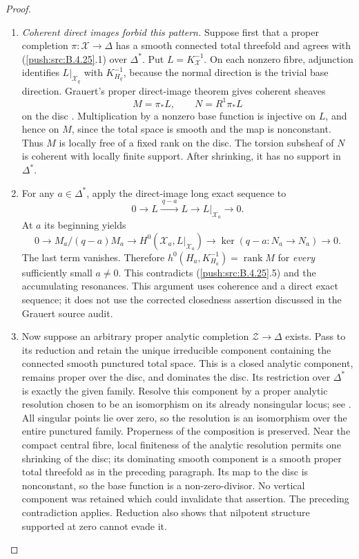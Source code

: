 \begin{proof}
\begin{enumerate}[label=\arabic*.,leftmargin=*]
\item \emph{Coherent direct images forbid this pattern.}
Suppose first that a proper completion
$\pi:\mathcal X\to\Delta$ has a smooth connected
total threefold and agrees with (\ref{push:src:B.4.25}.1) over
$\Delta^*$. Put $L=K_{\mathcal X}^{-1}$.
On each nonzero fibre, adjunction identifies
$L|_{\mathcal X_q}$ with $K_{H_q}^{-1}$, because
the normal direction is the trivial base direction.
Grauert's proper direct-image theorem gives coherent
sheaves
\[
 M=\pi_*L,\qquad N=R^1\pi_*L
\]
on the disc
\citep[Section 6, Hauptsatz I, p.~59]{Grauert1960D}.
Multiplication by a nonzero base function is injective
on $L$, and hence on $M$, since the total space is
smooth and the map is nonconstant. Thus $M$ is
locally free of a fixed rank on the disc. The torsion
subsheaf of $N$ is coherent with locally finite
support. After shrinking, it has no support in
$\Delta^*$.

\item For any $a\in\Delta^*$, apply the direct-image long
exact sequence to
\[
 0\longrightarrow L\xrightarrow{\ q-a\ }L
 \longrightarrow L|_{\mathcal X_a}\longrightarrow0.
\]
At $a$ its beginning yields
\[
 0\longrightarrow M_a/(q-a)M_a
 \longrightarrow H^0(\mathcal X_a,L|_{\mathcal X_a})
 \longrightarrow \ker(q-a:N_a\to N_a)
 \longrightarrow0.                                   \tag{B.4.25.6}
\]
The last term vanishes. Therefore
$h^0(H_a,K_{H_a}^{-1})=\operatorname{rank}M$ for
\emph{every} sufficiently small $a\ne0$. This
contradicts (\ref{push:src:B.4.25}.5) and the accumulating resonances.
This argument uses coherence and a direct exact
sequence; it does not use the corrected closedness
assertion discussed in the Grauert source audit.

\item Now suppose an arbitrary proper analytic completion
$\mathcal Z\to\Delta$ exists. Pass to its reduction
and retain the unique irreducible component containing
the connected smooth punctured total space. This is a
closed analytic component, remains proper over the
disc, and dominates the disc. Its restriction over
$\Delta^*$ is exactly the given family. Resolve this
component by a proper analytic resolution chosen to
be an isomorphism on its already nonsingular locus;
see \citet[Theorem 1.6 and the noncompact analytic
extension immediately following it]{BM95AB}.
All singular points lie over zero, so the resolution
is an isomorphism over the entire punctured family.
Properness of the composition is preserved. Near the
compact central fibre, local finiteness of the
analytic resolution permits one shrinking of the
disc; its dominating smooth component is a smooth
proper total threefold as in the preceding paragraph.
Its map to the disc is nonconstant, so the base
function is a non-zero-divisor. No vertical component
was retained which could invalidate that assertion.
The preceding contradiction applies. Reduction also
shows that nilpotent structure supported at zero
cannot evade it.


\end{enumerate}
\end{proof}
